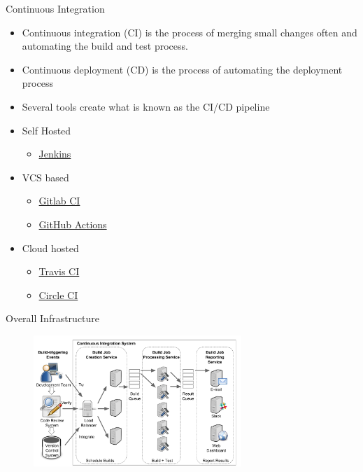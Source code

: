 \documentclass[aspectratio=169,xcolor=dvipsnames]{beamer}
\begin{document}
\begin{frame}{Continuous Integration}
    \begin{itemize}
        \item Continuous integration (CI) is the process of merging small changes often and automating the build and test process.
        \item Continuous deployment (CD) is the process of automating the deployment process
        \item Several tools create what is known as the CI/CD pipeline
    \end{itemize}

     \begin{itemize}
            \item Self Hosted
            \begin{itemize}
                \item \href{https://docs.gitlab.com/ee/ci/}{Jenkins \faExternalLink*}
                \end{itemize}
            \item VCS based
            \begin{itemize}
                \item \href{https://docs.gitlab.com/ee/ci/}{Gitlab CI \faExternalLink*}
                \item \href{https://github.com/features/actions}{GitHub Actions \faExternalLink*}
            \end{itemize}
            \item Cloud hosted
            \begin{itemize}
                \item \href{https://travis-ci.com/} {Travis CI \faExternalLink*} 
                \item \href{https://circleci.com/} {Circle CI \faExternalLink*}
            \end{itemize}
        \end{itemize}
\end{frame}

\begin{frame}{Overall Infrastructure}
    \begin{figure}
        \centering
        \includegraphics[width=0.7\textwidth]{images/infrastucture.png}
        \label{fig:my_label}
    \end{figure}
\end{frame}
\end{document}
